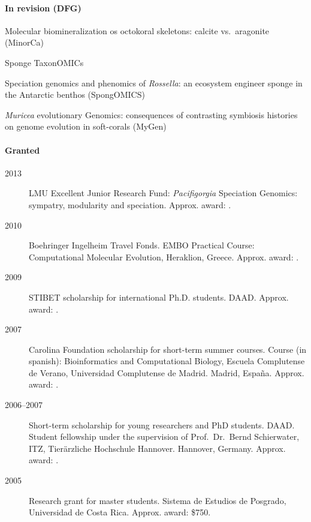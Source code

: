 \documentclass[letter,10pt]{article}
\begin{document}
\paragraph{In revision (DFG)}
\begin{description}
 \item Molecular biomineralization os octokoral skeletons: calcite vs.~aragonite (MinorCa)
 \item Sponge TaxonOMICs
 \item Speciation genomics and phenomics of \emph{Rossella}: an ecosystem engineer sponge in the Antarctic benthos (SpongOMICS)
 \item \emph{Muricea} evolutionary Genomics: consequences of contrasting symbiosis histories on genome evolution in soft-corals (MyGen)
\end{description}

\paragraph{Granted}
\begin{description}
\item[2013] LMU Excellent Junior Research Fund: \emph{Pacifigorgia} Speciation Genomics: sympatry, modularity and speciation. Approx. award: .

\item[2010] Boehringer Ingelheim Travel Fonds. EMBO Practical Course: Computational Molecular Evolution, Heraklion, Greece. Approx. award: .

\item[2009]  STIBET scholarship for international Ph.D. students. DAAD. Approx. award: . 

\item[2007] Carolina Foundation scholarship for short-term summer courses. Course (in spanish): Bioinformatics and Computational Biology, Escuela Complutense de Verano, Universidad Complutense de Madrid. Madrid, Espa\~na. Approx. award: .

\item[2006--2007] Short-term scholarship for young researchers and PhD students. DAAD. Student fellowship under the supervision of Prof.~Dr.~Bernd Schierwater, ITZ, Tier\"arzliche Hochschule Hannover. Hannover, Germany. Approx. award: .

\item[2005] Research grant for master students. Sistema de Estudios de Posgrado, Universidad de Costa Rica. Approx. award: \$750.
\end{description}
\end{document}
